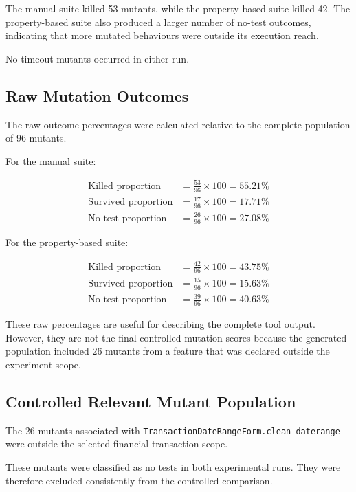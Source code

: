 \documentclass[12pt]{article}
\begin{document}
The manual suite killed 53 mutants, while the property-based suite killed 42.
The property-based suite also produced a larger number of no-test outcomes,
indicating that more mutated behaviours were outside its execution reach.

No timeout mutants occurred in either run.

\subsection{Raw Mutation Outcomes}

The raw outcome percentages were calculated relative to the complete
population of 96 mutants.

For the manual suite:

\begin{align}
\text{Killed proportion}
&=
\frac{53}{96}\times 100
=
55.21\% \\
\text{Survived proportion}
&=
\frac{17}{96}\times 100
=
17.71\% \\
\text{No-test proportion}
&=
\frac{26}{96}\times 100
=
27.08\%
\end{align}

For the property-based suite:

\begin{align}
\text{Killed proportion}
&=
\frac{42}{96}\times 100
=
43.75\% \\
\text{Survived proportion}
&=
\frac{15}{96}\times 100
=
15.63\% \\
\text{No-test proportion}
&=
\frac{39}{96}\times 100
=
40.63\%
\end{align}

These raw percentages are useful for describing the complete tool output.
However, they are not the final controlled mutation scores because the
generated population included 26 mutants from a feature that was declared
outside the experiment scope.

\subsection{Controlled Relevant Mutant Population}

The 26 mutants associated with
\texttt{TransactionDateRangeForm.clean\_daterange} were outside the selected
financial transaction scope.

These mutants were classified as no tests in both experimental runs. They were
therefore excluded consistently from the controlled comparison.
\end{document}
